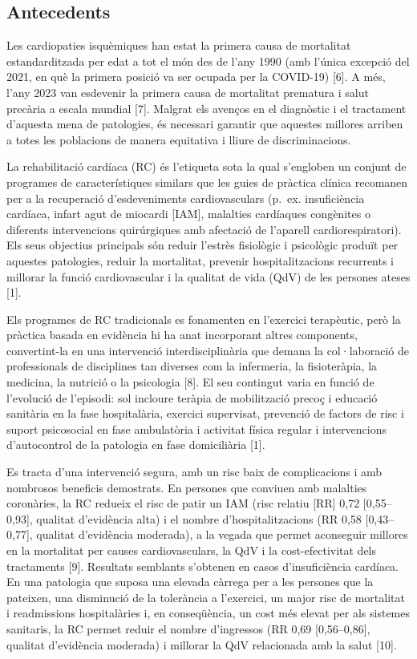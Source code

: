 \documentclass[CAT]{TFUOC}%
\begin{document}
\subsection{Antecedents}\label{antecedents}

Les cardiopaties isquèmiques han estat la primera causa de mortalitat estandarditzada per edat a tot el món des de l'any 1990 (amb l'única excepció del 2021, en què la primera posició va ser ocupada per la COVID-19) {[}6{]}. A més, l'any 2023 van esdevenir la primera causa de mortalitat prematura i salut precària a escala mundial {[}7{]}. Malgrat els avenços en el diagnòstic i el tractament d'aquesta mena de patologies, és necessari garantir que aquestes millores arriben a totes les poblacions de manera equitativa i lliure de discriminacions.

La rehabilitació cardíaca (RC) és l'etiqueta sota la qual s'engloben un conjunt de programes de característiques similars que les guies de pràctica clínica recomanen per a la recuperació d'esdeveniments cardiovasculars (p.~ex. insuficiència cardíaca, infart agut de miocardi {[}IAM{]}, malalties cardíaques congènites o diferents intervencions quirúrgiques amb afectació de l'aparell cardiorespiratori). Els seus objectius principals són reduir l'estrès fisiològic i psicològic produït per aquestes patologies, reduir la mortalitat, prevenir hospitalitzacions recurrents i millorar la funció cardiovascular i la qualitat de vida (QdV) de les persones ateses {[}1{]}.

Els programes de RC tradicionals es fonamenten en l'exercici terapèutic, però la pràctica basada en evidència hi ha anat incorporant altres components, convertint-la en una intervenció interdisciplinària que demana la col·laboració de professionals de disciplines tan diverses com la infermeria, la fisioteràpia, la medicina, la nutrició o la psicologia {[}8{]}. El seu contingut varia en funció de l'evolució de l'episodi: sol incloure teràpia de mobilització precoç i educació sanitària en la fase hospitalària, exercici supervisat, prevenció de factors de risc i suport psicosocial en fase ambulatòria i activitat física regular i intervencions d'autocontrol de la patologia en fase domiciliària {[}1{]}.

Es tracta d'una intervenció segura, amb un risc baix de complicacions i amb nombrosos beneficis demostrats. En persones que conviuen amb malalties coronàries, la RC redueix el risc de patir un IAM (risc relatiu {[}RR{]} 0,72 {[}0,55--0,93{]}, qualitat d'evidència alta) i el nombre d'hospitalitzacions (RR 0,58 {[}0,43--0,77{]}, qualitat d'evidència moderada), a la vegada que permet aconseguir millores en la mortalitat per causes cardiovasculars, la QdV i la cost-efectivitat dels tractaments {[}9{]}. Resultats semblants s'obtenen en casos d'insuficiència cardíaca. En una patologia que suposa una elevada càrrega per a les persones que la pateixen, una disminució de la tolerància a l'exercici, un major risc de mortalitat i readmissions hospitalàries i, en conseqüència, un cost més elevat per als sistemes sanitaris, la RC permet reduir el nombre d'ingressos (RR 0,69 {[}0,56--0,86{]}, qualitat d'evidència moderada) i millorar la QdV relacionada amb la salut {[}10{]}.
\end{document}
